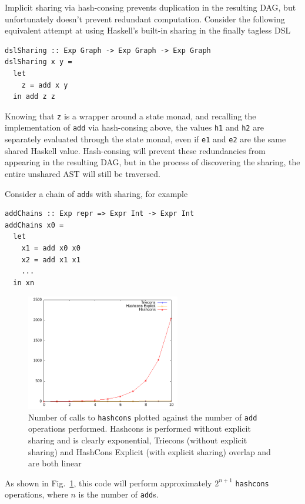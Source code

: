 \documentclass[runningheads]{llncs}
\begin{document}
Implicit sharing via hash-consing prevents duplication in the resulting DAG, but
unfortunately doesn't prevent redundant computation. Consider the following
equivalent attempt at using Haskell's built-in sharing in the finally tagless DSL
\begin{verbatim}
dslSharing :: Exp Graph -> Exp Graph -> Exp Graph
dslSharing x y =
  let
    z = add x y
  in add z z
\end{verbatim}
Knowing that \texttt{z} is a wrapper around a state monad,
and recalling the implementation of
\texttt{add} via hash-consing above, 
the values \texttt{h1} and \texttt{h2} are
separately evaluated through the state monad, even if \texttt{e1} and \texttt{e2} are the same shared Haskell value. 
Hash-consing will prevent these redundancies from appearing in
the resulting DAG, 
but in the process of discovering the sharing, the entire unshared AST will still be traversed.

Consider a chain of \texttt{add}s  with sharing, for example
\begin{verbatim}
addChains :: Exp repr => Expr Int -> Expr Int
addChains x0 = 
  let
    x1 = add x0 x0
    x2 = add x1 x1
    ...
  in xn
\end{verbatim}

\vspace{-1cm}
\begin{figure}
  \centering
  \includegraphics[width=0.6\textwidth]{figs/hashconscmp.png}
  \caption{Number of calls to \texttt{hashcons} plotted against the
    number of \texttt{add} operations performed.
    Hashcons is performed without explicit sharing and is clearly exponential,
    Triecons (without explicit sharing) and HashCons Explicit (with explicit
    sharing) overlap and are both linear
  } \label{fig:hashcons}
\end{figure}
As shown in Fig.~\ref{fig:hashcons}, this code will perform approximately
$2^{n+1}$ \texttt{hashcons} operations, where $n$ is the number of \texttt{add}s.
\end{document}
